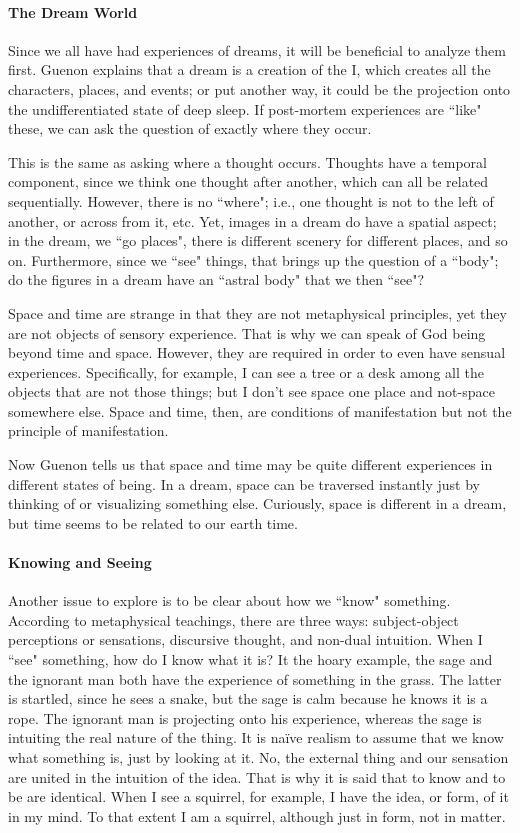 \paragraph{The Dream World}
Since we all have had experiences of dreams, it will be beneficial to analyze them first. Guenon explains that a dream is a creation of the I, which creates all the characters, places, and events; or put another way, it could be the projection onto the undifferentiated state of deep sleep. If post-mortem experiences are ``like" these, we can ask the question of exactly where they occur.

This is the same as asking where a thought occurs. Thoughts have a temporal component, since we think one thought after another, which can all be related sequentially. However, there is no ``where"; i.e., one thought is not to the left of another, or across from it, etc. Yet, images in a dream do have a spatial aspect; in the dream, we ``go places", there is different scenery for different places, and so on. Furthermore, since we ``see" things, that brings up the question of a ``body"; do the figures in a dream have an ``astral body" that we then ``see"?

Space and time are strange in that they are not metaphysical principles, yet they are not objects of sensory experience. That is why we can speak of God being beyond time and space. However, they are required in order to even have sensual experiences. Specifically, for example, I can see a tree or a desk among all the objects that are not those things; but I don't see space one place and not-space somewhere else. Space and time, then, are conditions of manifestation but not the principle of manifestation.

Now Guenon tells us that space and time may be quite different experiences in different states of being. In a dream, space can be traversed instantly just by thinking of or visualizing something else. Curiously, space is different in a dream, but time seems to be related to our earth time.

\paragraph{Knowing and Seeing}
Another issue to explore is to be clear about how we ``know" something. According to metaphysical teachings, there are three ways: subject-object perceptions or sensations, discursive thought, and non-dual intuition. When I ``see" something, how do I know what it is? It the hoary example, the sage and the ignorant man both have the experience of something in the grass. The latter is startled, since he sees a snake, but the sage is calm because he knows it is a rope. The ignorant man is projecting onto his experience, whereas the sage is intuiting the real nature of the thing. It is naïve realism to assume that we know what something is, just by looking at it. No, the external thing and our sensation are united in the intuition of the idea. That is why it is said that to know and to be are identical. When I see a squirrel, for example, I have the idea, or form, of it in my mind. To that extent I am a squirrel, although just in form, not in matter.

